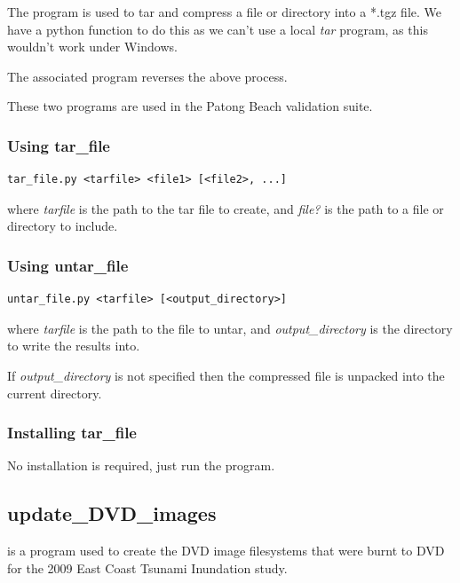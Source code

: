 \documentclass{manual}
\begin{document}
The  program is used to tar and compress a file or directory into a *.tgz file.
We have a python function to do this as we can't use a local \emph{tar} program, as this wouldn't
work under Windows.

The associated  program reverses the above process.

These two programs are used in the Patong Beach validation suite.

\subsubsection{Using tar_file}
\label{subsubsec:tar_file_use}

\begin{verbatim}
tar_file.py <tarfile> <file1> [<file2>, ...]
\end{verbatim}

where \emph{tarfile} is the path to the tar file to create,
and \emph{file?} is the path to a file or  directory to include.

\subsubsection{Using untar_file}
\label{subsubsec:untar_file_use}

\begin{verbatim}
untar_file.py <tarfile> [<output_directory>]
\end{verbatim}

where \emph{tarfile} is the path to the file to untar,
and \emph{output_directory} is the directory to write the results into.

If \emph{output_directory} is not specified then the compressed file is unpacked
into the current directory.

\subsubsection{Installing tar_file}
\label{subsubsec:tar_file_install}

No installation is required, just run the program.

\pagebreak

\subsection{update_DVD_images}
\label{subsec:update_DVD_images}

 is a program used to create the DVD image filesystems that were burnt to DVD
for the 2009 East Coast Tsunami Inundation study.
\end{document}
